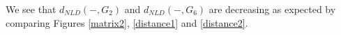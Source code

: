 \documentclass{amsart}
\begin{document}
	 
	 
	We see that $d_{NLD}(-,G_2)$ and $d_{NLD}(-,G_6)$ are decreasing as expected by comparing Figures \ref{matrix2}, \ref{distance1} and \ref{distance2}.
	

	
	
\end{document}
